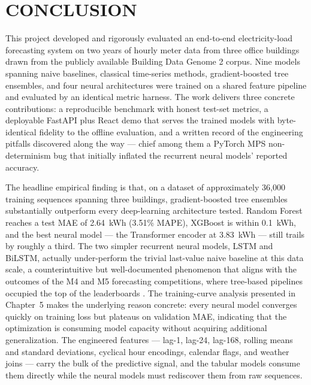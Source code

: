 \documentclass[12pt,a4paper,openany]{report}
\begin{document}
\chapter{CONCLUSION}

This project developed and rigorously evaluated an end-to-end electricity-load forecasting system on two years of hourly meter data from three office buildings drawn from the publicly available Building Data Genome 2 corpus. Nine models spanning naive baselines, classical time-series methods, gradient-boosted tree ensembles, and four neural architectures were trained on a shared feature pipeline and evaluated by an identical metric harness. The work delivers three concrete contributions: a reproducible benchmark with honest test-set metrics, a deployable FastAPI plus React demo that serves the trained models with byte-identical fidelity to the offline evaluation, and a written record of the engineering pitfalls discovered along the way --- chief among them a PyTorch MPS non-determinism bug that initially inflated the recurrent neural models' reported accuracy.

The headline empirical finding is that, on a dataset of approximately 36{,}000 training sequences spanning three buildings, gradient-boosted tree ensembles substantially outperform every deep-learning architecture tested. Random Forest reaches a test MAE of 2.64~kWh (3.51\% MAPE), XGBoost is within 0.1~kWh, and the best neural model --- the Transformer encoder at 3.83~kWh --- still trails by roughly a third. The two simpler recurrent neural models, LSTM and BiLSTM, actually under-perform the trivial last-value naive baseline at this data scale, a counterintuitive but well-documented phenomenon that aligns with the outcomes of the M4 and M5 forecasting competitions, where tree-based pipelines occupied the top of the leaderboards \cite{ref_makridakis_m4, ref_makridakis_m5}. The training-curve analysis presented in Chapter~5 makes the underlying reason concrete: every neural model converges quickly on training loss but plateaus on validation MAE, indicating that the optimization is consuming model capacity without acquiring additional generalization. The engineered features --- lag-1, lag-24, lag-168, rolling means and standard deviations, cyclical hour encodings, calendar flags, and weather joins --- carry the bulk of the predictive signal, and the tabular models consume them directly while the neural models must rediscover them from raw sequences.
\end{document}
